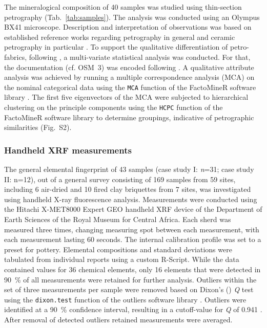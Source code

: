 \documentclass[preprint,10pt,oneside,onecolumn,authoryear]{elsarticle}
\begin{document}
The mineralogical composition of 40 samples was studied using thin-section petrography (Tab.~\ref{tab:samples}). The analysis was conducted using an Olympus BX41 microscope. Description and interpretation of observations was based on established reference works regarding petrography in general \citep{MacKenzie.1980,Adams.1988,Yardley.1990,MacKenzie.1991,MacKenzie.2017} and ceramic petrography in particular \citep{Peterson.2009,Quinn.2022}. To support the qualitative differentiation of petro-fabrics, following \citet{Quinn.2022}, a multi-variate statistical analysis was conducted. For that, the documentation (cf. OSM~3) was encoded following \citet[1336-1137 Appendix 2--3]{Cau.2004}. A qualitative attribute analysis was achieved by running a multiple correspondence analysis (MCA) on the nominal categorical data using the \verb|MCA| function of the FactoMineR software library \citep[v2.10]{Le.2008}. The first five eigenvectors of the MCA were subjected to hierarchical clustering on the principle components using the \verb|HCPC| function of the FactoMineR software library to determine groupings, indicative of petrographic similarities (Fig.~S2).

\subsubsection{Handheld XRF measurements}

The general elemental fingerprint of 43 samples (case study I: \textit{n}=31; case study II: n=12), out of a general survey consisting of 169 samples from 59 sites, including 6 air-dried and 10 fired clay briquettes from 7 sites, was investigated using handheld X-ray fluorescence analysis. Measurements were conducted using the Hitachi X-MET8000 Expert GEO handheld XRF device of the Department of Earth Sciences of the Royal Museum for Central Africa. Each sherd was measured three times, changing measuring spot between each measurement, with each measurement lasting 60 seconds. The internal calibration profile was set to a preset for pottery. Elemental compositions and standard deviations were tabulated from individual reports using a custom R-Script. While the data contained values for 36 chemical elements, only 16 elements that were detected in 90~\% of all measurements were retained for further analysis. Outliers within the set of three measurements per sample were removed based on Dixon's (\citeyear{Dixon.1950}) \textit{Q} test using the \verb|dixon.test| function of the outliers software library \citep[v0.15]{Komsta.2022}. Outliers were identified at a 90~\% confidence interval, resulting in a cutoff-value for \textit{Q} of 0.941 \citep[142 Tab.~1]{Rorabacher.1991}. After removal of detected outliers retained measurements were averaged.
\end{document}
